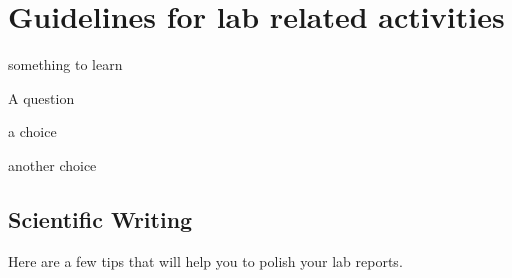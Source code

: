 
\chapter{Guidelines for lab related activities}
\label{chapter:labs}


\begin{learningObjectives}{
 \item something to learn
 }
\end{learningObjectives}

\begin{opening}
\begin{MCquestion}{A question}
\item a choice
\item another choice %
\end{MCquestion}
\end{opening}

\section{Scientific Writing}

Here are a few tips that will help you to polish your lab reports. %

